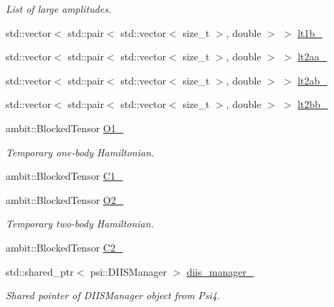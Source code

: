 \begin{DoxyCompactItemize}
\begin{DoxyCompactList}\small\item\em List of large amplitudes. \end{DoxyCompactList}\item 
std\+::vector$<$ std\+::pair$<$ std\+::vector$<$ size\+\_\+t $>$, double $>$ $>$ \mbox{\hyperlink{classforte_1_1_m_r_d_s_r_g_a6c654d5e927665d284cc659cbf84a094}{lt1b\+\_\+}}
\item 
std\+::vector$<$ std\+::pair$<$ std\+::vector$<$ size\+\_\+t $>$, double $>$ $>$ \mbox{\hyperlink{classforte_1_1_m_r_d_s_r_g_abf03f8dae39bce9d63008bed8f14e249}{lt2aa\+\_\+}}
\item 
std\+::vector$<$ std\+::pair$<$ std\+::vector$<$ size\+\_\+t $>$, double $>$ $>$ \mbox{\hyperlink{classforte_1_1_m_r_d_s_r_g_ad1d42e8c6c59575f5e298ce40284f59e}{lt2ab\+\_\+}}
\item 
std\+::vector$<$ std\+::pair$<$ std\+::vector$<$ size\+\_\+t $>$, double $>$ $>$ \mbox{\hyperlink{classforte_1_1_m_r_d_s_r_g_a0dc43fa9007bd814814fb609fc7fad80}{lt2bb\+\_\+}}
\item 
ambit\+::\+Blocked\+Tensor \mbox{\hyperlink{classforte_1_1_m_r_d_s_r_g_a0637c2cdae2b1949ed13d40487d4a894}{O1\+\_\+}}
\begin{DoxyCompactList}\small\item\em Temporary one-\/body Hamiltonian. \end{DoxyCompactList}\item 
ambit\+::\+Blocked\+Tensor \mbox{\hyperlink{classforte_1_1_m_r_d_s_r_g_a7b1c05e22599c9f0b805a774345b0a20}{C1\+\_\+}}
\item 
ambit\+::\+Blocked\+Tensor \mbox{\hyperlink{classforte_1_1_m_r_d_s_r_g_a035b2cab3b5badb119d4a6b3072454ce}{O2\+\_\+}}
\begin{DoxyCompactList}\small\item\em Temporary two-\/body Hamiltonian. \end{DoxyCompactList}\item 
ambit\+::\+Blocked\+Tensor \mbox{\hyperlink{classforte_1_1_m_r_d_s_r_g_af45c6effbe8277d9a54859cfda310021}{C2\+\_\+}}
\item 
std\+::shared\+\_\+ptr$<$ psi\+::\+D\+I\+I\+S\+Manager $>$ \mbox{\hyperlink{classforte_1_1_m_r_d_s_r_g_a1f81bd3839c35049c7afab1176323a03}{diis\+\_\+manager\+\_\+}}
\begin{DoxyCompactList}\small\item\em Shared pointer of D\+I\+I\+S\+Manager object from Psi4. \end{DoxyCompactList}\item 

\end{DoxyCompactItemize}

